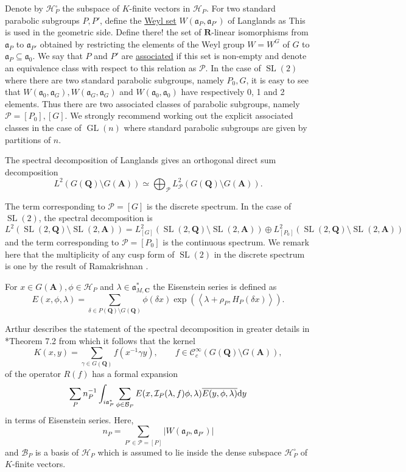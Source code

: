 \documentclass[11pt]{amsart}
\def\A{\mathbf A}
\def\C{\mathbf C}
\def\Q{\mathbf Q}
\def\R{\mathbf R}
\def\BBB{\mathcal B}
\def\CCC{\mathcal C}
\def\HHH{\mathcal H}
\def\III{\mathcal I}
\def\PPP{\mathcal P}
\def\aaa{\mathfrak a}
\def\cb#1{{\color{blue}#1}}
\def\d{\text d}
\def\bs{\setminus} 			%
\def\gl{\operatorname{GL}}
\def\Ltwo{L^2}
\def\mod#1{\lvert #1 \rvert} %
\def\se{\subseteq}
\def\sl{\operatorname{SL}}
\def\sprod#1#2{\left\langle #1 , #2 \right\rangle}  %
\theoremstyle{remark}
\begin{document}
Denote by $\HHH_P^\circ$ the subspace of $K$-finite vectors in $\HHH_P$. For two standard parabolic subgroups $P, P'$, define the \underline{Weyl set} $W(\aaa_P, \aaa_{P'})$ of Langlands as {\color{red} This is used in the geometric side. Define there!} the set of $\R$-linear isomorphisms from $\aaa_P$ to $\aaa_{P'}$ obtained by restricting the elements of the Weyl group $W = W^G$ of $G$ to $\aaa_P \se \aaa_0$. We say that $P$ and $P'$ are \underline{associated} if this set is non-empty and denote an equivalence class with respect to this relation as $\PPP$. \cb{In the case of $\sl(2)$ where there are two standard parabolic subgroups, namely $P_0, G$, it is easy to see that $W(\aaa_0, \aaa_G), W(\aaa_G, \aaa_G)$ and $W(\aaa_0, \aaa_0)$ have respectively 0, 1 and 2 elements. Thus there are two associated classes of parabolic subgroups, namely $\PPP = [P_0], [G]$.} We strongly recommend working out the explicit associated classes in the case of $\gl(n)$ where standard parabolic subgroups are given by partitions of $n$.

The spectral decomposition of Langlands gives an orthogonal direct sum decomposition
\[ \Ltwo(G(\Q)\bs G(\A)) \simeq \bigoplus_{\PPP} \Ltwo_\PPP(G(\Q)\bs G(\A)). \]

The term corresponding to $\PPP = [G]$ is the discrete spectrum. 
\cb{In the case of $\sl(2)$, the spectral decomposition is 
\[ \Ltwo(\sl(2, \Q)\bs \sl(2, \A)) = \Ltwo_{[G]} (\sl(2, \Q)\bs \sl(2, \A)) \oplus \Ltwo_{[P_0]} (\sl(2, \Q)\bs \sl(2, \A)) \]
and the term corresponding to $\PPP = [P_0]$ is the continuous spectrum. We remark here that the multiplicity of any cusp form of $\sl(2)$ in the discrete spectrum is one by the result of Ramakrishnan \cite{MR1792292}.}

For $x \in G(\A), \phi \in \HHH_P$ and $\lambda \in \aaa_{M, \C}^*$ the Eisenstein series is defined as
\[ E(x, \phi, \lambda) = \sum_{\delta \in P(\Q) \bs G(\Q)} \phi(\delta x) 
		\exp(\sprod{\lambda + \rho_P}{H_P(\delta x)}). \]

Arthur describes the statement of the spectral decomposition in greater details in \cite{clay}*{Theorem 7.2} from which it follows that the kernel 
\[ K(x, y) = \sum_{\gamma \in G(\Q)} f(x^{-1}\gamma y) , \qquad f \in \CCC_c^\infty(G(\Q)\bs G(\A)),\]
of the operator $R(f)$ has a formal expansion
\[ \sum_{P} n_P^{-1} \int_{i\aaa_P^*} \sum_{\phi \in \BBB_P} E(x, \III_P(\lambda, f)\phi, \lambda) 
		\overline{E(y, \phi, \lambda)} \d y \]
in terms of Eisenstein series. Here, 
\[ n_P = \sum_{P' \in \PPP = [P]} \mod{W(\aaa_P, \aaa_{P'})} \]
and $\BBB_P$ is a basis of $\HHH_P$ which is assumed to lie inside the dense subspace $\HHH_P^\circ$ of $K$-finite vectors. 
\end{document}
